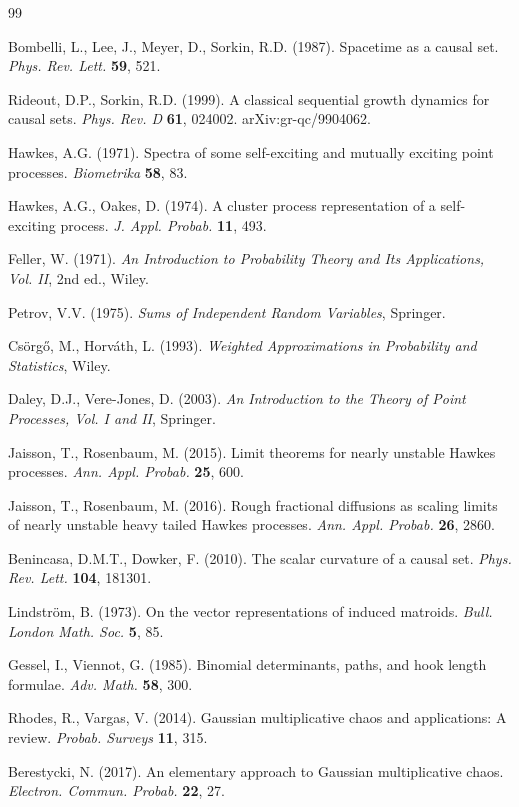 \documentclass[11pt,a4paper]{article}
\begin{document}
\begin{thebibliography}{99}

 Bombelli, L., Lee, J., Meyer, D., Sorkin, R.D. (1987). Spacetime as a causal set. \emph{Phys. Rev. Lett.} \textbf{59}, 521.

 Rideout, D.P., Sorkin, R.D. (1999). A classical sequential growth dynamics for causal sets. \emph{Phys. Rev. D} \textbf{61}, 024002. arXiv:gr-qc/9904062.

 Hawkes, A.G. (1971). Spectra of some self-exciting and mutually exciting point processes. \emph{Biometrika} \textbf{58}, 83.

 Hawkes, A.G., Oakes, D. (1974). A cluster process representation of a self-exciting process. \emph{J. Appl. Probab.} \textbf{11}, 493.

 Feller, W. (1971). \emph{An Introduction to Probability Theory and Its Applications, Vol. II}, 2nd ed., Wiley.

 Petrov, V.V. (1975). \emph{Sums of Independent Random Variables}, Springer.

 Csörgő, M., Horváth, L. (1993). \emph{Weighted Approximations in Probability and Statistics}, Wiley.

 Daley, D.J., Vere-Jones, D. (2003). \emph{An Introduction to the Theory of Point Processes, Vol. I and II}, Springer.

 Jaisson, T., Rosenbaum, M. (2015). Limit theorems for nearly unstable Hawkes processes. \emph{Ann. Appl. Probab.} \textbf{25}, 600.

 Jaisson, T., Rosenbaum, M. (2016). Rough fractional diffusions as scaling limits of nearly unstable heavy tailed Hawkes processes. \emph{Ann. Appl. Probab.} \textbf{26}, 2860.

 Benincasa, D.M.T., Dowker, F. (2010). The scalar curvature of a causal set. \emph{Phys. Rev. Lett.} \textbf{104}, 181301.

 Lindström, B. (1973). On the vector representations of induced matroids. \emph{Bull. London Math. Soc.} \textbf{5}, 85.

 Gessel, I., Viennot, G. (1985). Binomial determinants, paths, and hook length formulae. \emph{Adv. Math.} \textbf{58}, 300.

 Rhodes, R., Vargas, V. (2014). Gaussian multiplicative chaos and applications: A review. \emph{Probab. Surveys} \textbf{11}, 315.

 Berestycki, N. (2017). An elementary approach to Gaussian multiplicative chaos. \emph{Electron. Commun. Probab.} \textbf{22}, 27.

\end{thebibliography}
\end{document}
